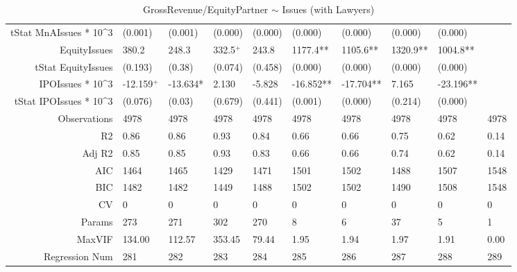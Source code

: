 \begin{table}[ht]
\begin{tabular}{rlllllllll}
  tStat MnAIssues * 10^3 & (0.001) & (0.001) & (0.000) & (0.000) & (0.000) & (0.000) & (0.000) & (0.000) &  \\ 
  EquityIssues & 380.2 & 248.3 & 332.5$^{+}$ & 243.8 & 1177.4** & 1105.6** & 1320.9** & 1004.8** &  \\ 
  tStat EquityIssues & (0.193) & (0.38) & (0.074) & (0.458) & (0.000) & (0.000) & (0.000) & (0.000) &  \\ 
  IPOIssues * 10^3 & -12.159$^{+}$ & -13.634* & 2.130 & -5.828 & -16.852** & -17.704** & 7.165 & -23.196** &  \\ 
  tStat IPOIssues * 10^3 & (0.076) & (0.03) & (0.679) & (0.441) & (0.001) & (0.000) & (0.214) & (0.000) &  \\ 
  Observations & 4978 & 4978 & 4978 & 4978 & 4978 & 4978 & 4978 & 4978 & 4978 \\ 
  R2 & 0.86 & 0.86 & 0.93 & 0.84 & 0.66 & 0.66 & 0.75 & 0.62 & 0.14 \\ 
  Adj R2 & 0.85 & 0.85 & 0.93 & 0.83 & 0.66 & 0.66 & 0.74 & 0.62 & 0.14 \\ 
  AIC & 1464 & 1465 & 1429 & 1471 & 1501 & 1502 & 1488 & 1507 & 1548 \\ 
  BIC & 1482 & 1482 & 1449 & 1488 & 1502 & 1502 & 1490 & 1508 & 1548 \\ 
  CV & 0 & 0 & 0 & 0 & 0 & 0 & 0 & 0 & 0 \\ 
  Params & 273 & 271 & 302 & 270 & 8 & 6 & 37 & 5 & 1 \\ 
  MaxVIF & 134.00 & 112.57 & 353.45 & 79.44 & 1.95 & 1.94 & 1.97 & 1.91 & 0.00 \\ 
  Regression Num & 281 & 282 & 283 & 284 & 285 & 286 & 287 & 288 & 289 \\ 
   \hline
\end{tabular}
\caption{GrossRevenue/EquityPartner $\sim$ Issues (with Lawyers)} 
\end{table}
